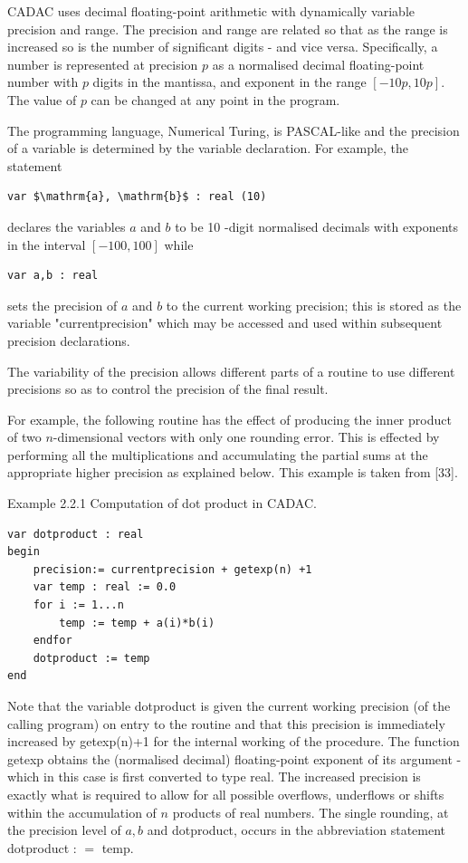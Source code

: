 \documentclass[10pt]{article}
\begin{document}
CADAC uses decimal floating-point arithmetic with dynamically variable precision and range. The precision and range are related so that as the range is increased so is the number of significant digits - and vice versa. Specifically, a number is represented at precision $p$ as a normalised decimal floating-point number with $p$ digits in the mantissa, and exponent in the range $[-10 p, 10 p]$. The value of $p$ can be changed at any point in the program.

The programming language, Numerical Turing, is PASCAL-like and the precision of a variable is determined by the variable declaration. For example, the statement

\begin{verbatim}
var $\mathrm{a}, \mathrm{b}$ : real (10)
\end{verbatim}

declares the variables $a$ and $b$ to be 10 -digit normalised decimals with exponents in the interval $[-100,100]$ while

\begin{verbatim}
var a,b : real
\end{verbatim}

sets the precision of $a$ and $b$ to the current working precision; this is stored as the variable "currentprecision" which may be accessed and used within subsequent precision declarations.

The variability of the precision allows different parts of a routine to use different precisions so as to control the precision of the final result.

For example, the following routine has the effect of producing the inner product of two $n$-dimensional vectors with only one rounding error. This is effected by performing all the multiplications and accumulating the partial sums at the appropriate higher precision as explained below. This example is taken from [33].

Example 2.2.1 Computation of dot product in CADAC.

\begin{verbatim}
var dotproduct : real
begin
    precision:= currentprecision + getexp(n) +1
    var temp : real := 0.0
    for i := 1...n
        temp := temp + a(i)*b(i)
    endfor
    dotproduct := temp
end
\end{verbatim}

Note that the variable dotproduct is given the current working precision (of the calling program) on entry to the routine and that this precision is immediately increased by getexp(n)+1 for the internal working of the procedure. The function getexp obtains the (normalised decimal) floating-point exponent of its argument - which in this case is first converted to type real. The increased precision is exactly what is required to allow for all possible overflows, underflows or shifts within the accumulation of $n$ products of real numbers. The single rounding, at the precision level of $a, b$ and dotproduct, occurs in the abbreviation statement\\
dotproduct : $=$ temp.
\end{document}
